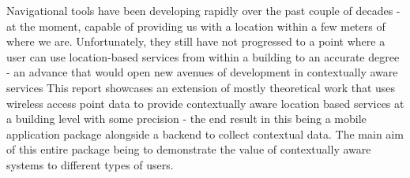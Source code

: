 Navigational tools have been developing rapidly over the past couple of decades - at the moment, capable of providing us with a location within a few meters of where we are. Unfortunately, they still have not progressed to a point where a user can use location-based services from within a building to an accurate degree - an advance that would open new avenues of development in contextually aware services
\newline
\newline
This report showcases an extension of mostly theoretical work that uses wireless access point data to provide contextually aware location based services at a building level with some precision - the end result in this being a mobile application package alongside a backend to collect contextual data. The main aim of this entire package being to demonstrate the value of contextually aware systems to different types of users.